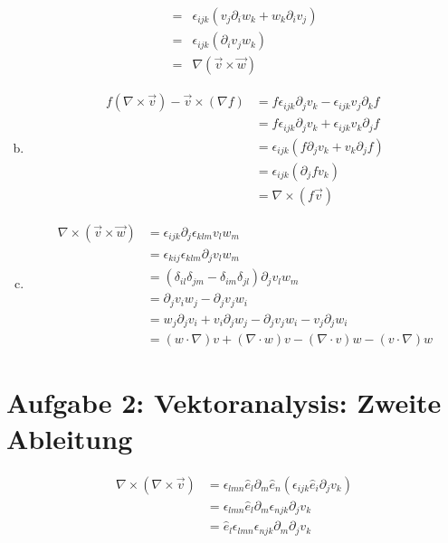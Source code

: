 \documentclass[a4paper,german,12pt,smallheadings]{scrartcl}
\begin{document}
\begin{enumerate}[a)]
\begin{align}
      =  &\epsilon_{ijk} (v_j \partial_i w_k + w_k \partial_i v_j) \\
      =  &\epsilon_{ijk} (\partial_i v_j w_k) \\
      =  &\nabla (\vec{v} \times \vec{w})
    \end{align}
  \item
    \begin{align}
      f(\nabla \times \vec{v}) - \vec{v} \times (\nabla f)
      &= f \epsilon_{ijk} \partial_j v_k - \epsilon_{ijk} v_j \partial_k f \\
      &= f \epsilon_{ijk} \partial_j v_k + \epsilon_{ijk} v_k \partial_j f \\
      &= \epsilon_{ijk} (f \partial_j v_k + v_k \partial_j f) \\
      &= \epsilon_{ijk} (\partial_j f v_k) \\
      &= \nabla \times (f \vec{v})
    \end{align}
  \item
    \begin{align}
      \nabla \times (\vec{v} \times \vec{w})
       &= \epsilon_{ijk} \partial_j \epsilon_{klm} v_l w_m \\
       &= \epsilon_{kij} \epsilon_{klm} \partial_j v_l w_m \\
       &= (\delta_{il} \delta_{jm} - \delta_{im} \delta_{jl}) \partial_j v_l w_m \\
       &= \partial_j v_i w_j - \partial_j v_j w_i \\
       &= w_j \partial_j v_i + v_i \partial_j w_j - \partial_j v_j w_i - v_j \partial_j w_i \\
       &= (w \cdot \nabla) v + (\nabla \cdot w) v - (\nabla \cdot v) w - (v \cdot \nabla) w
    \end{align}
\end{enumerate}

\section*{Aufgabe 2: Vektoranalysis: Zweite Ableitung}

\begin{align}
     \nabla \times (\nabla \times \vec{v})
     &= \epsilon_{lmn} \hat{e}_l \partial_m \hat{e}_n (\epsilon_{ijk} \hat{e}_i \partial_j v_k) \\
     &= \epsilon_{lmn} \hat{e}_l \partial_m \epsilon_{njk} \partial_j v_k \\
     &= \hat{e}_l \epsilon_{lmn} \epsilon_{njk} \partial_m \partial_j v_k
\end{align}
\end{document}
